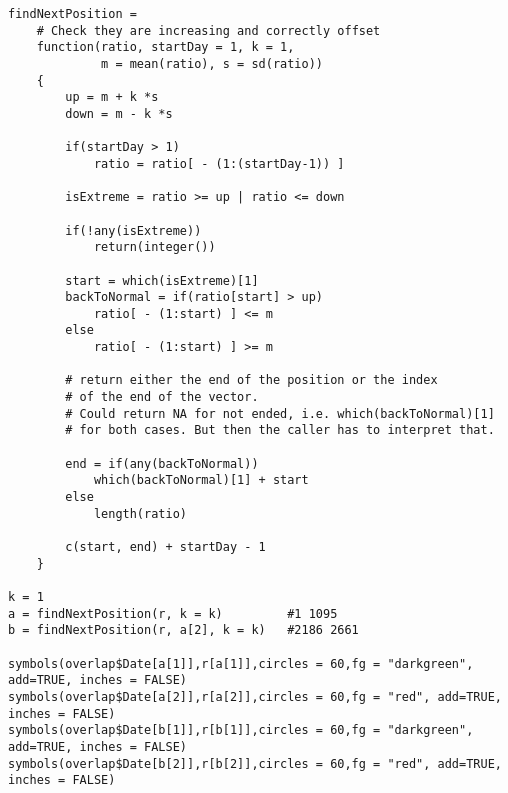 \documentclass{article}
\begin{document}
\begin{verbatim}
findNextPosition =
    # Check they are increasing and correctly offset
    function(ratio, startDay = 1, k = 1, 
             m = mean(ratio), s = sd(ratio))
    {
        up = m + k *s
        down = m - k *s
        
        if(startDay > 1)
            ratio = ratio[ - (1:(startDay-1)) ]
        
        isExtreme = ratio >= up | ratio <= down
        
        if(!any(isExtreme))
            return(integer())
        
        start = which(isExtreme)[1]
        backToNormal = if(ratio[start] > up)
            ratio[ - (1:start) ] <= m
        else
            ratio[ - (1:start) ] >= m
        
        # return either the end of the position or the index 
        # of the end of the vector.
        # Could return NA for not ended, i.e. which(backToNormal)[1]
        # for both cases. But then the caller has to interpret that.
        
        end = if(any(backToNormal))
            which(backToNormal)[1] + start
        else
            length(ratio)
        
        c(start, end) + startDay - 1 
    }

k = 1
a = findNextPosition(r, k = k)         #1 1095
b = findNextPosition(r, a[2], k = k)   #2186 2661

symbols(overlap$Date[a[1]],r[a[1]],circles = 60,fg = "darkgreen", add=TRUE, inches = FALSE)
symbols(overlap$Date[a[2]],r[a[2]],circles = 60,fg = "red", add=TRUE, inches = FALSE)
symbols(overlap$Date[b[1]],r[b[1]],circles = 60,fg = "darkgreen", add=TRUE, inches = FALSE)
symbols(overlap$Date[b[2]],r[b[2]],circles = 60,fg = "red", add=TRUE, inches = FALSE)
\end{verbatim}
\end{document}
